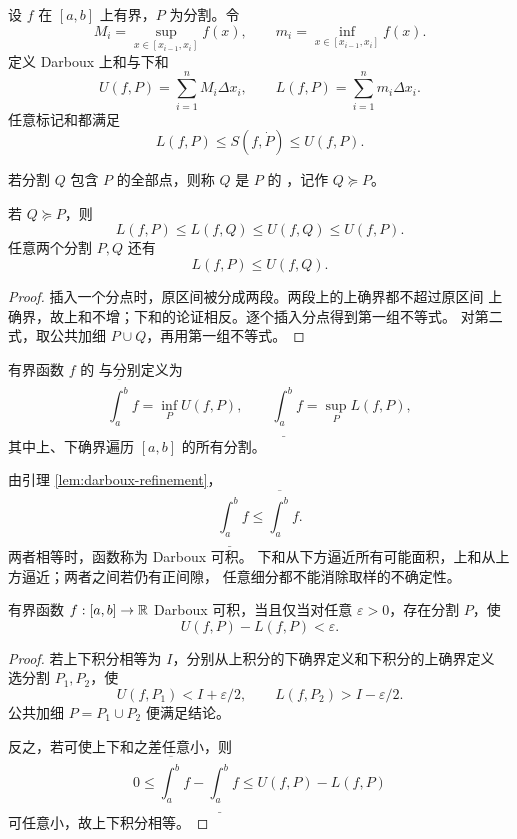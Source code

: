 设 \(f\) 在 \([a,b]\) 上有界，\(P\) 为分割。令
\[
 M_i=\sup_{x\in[x_{i-1},x_i]}f(x),\qquad
 m_i=\inf_{x\in[x_{i-1},x_i]}f(x).
\]
定义 Darboux 上和与下和
\[
 U(f,P)=\sum_{i=1}^n M_i\Delta x_i,\qquad
 L(f,P)=\sum_{i=1}^n m_i\Delta x_i.
\]
任意标记和都满足
\[
 L(f,P)\le S(f,\dot P)\le U(f,P).
\]

\begin{definition}
若分割 \(Q\) 包含 \(P\) 的全部点，则称 \(Q\) 是 \(P\) 的
，记作 \(Q\succeq P\)。
\end{definition}

\begin{lemma}[加细的单调性]
\label{lem:darboux-refinement}
若 \(Q\succeq P\)，则
\[
 L(f,P)\le L(f,Q)\le U(f,Q)\le U(f,P).
\]
任意两个分割 \(P,Q\) 还有
\[
 L(f,P)\le U(f,Q).
\]
\end{lemma}

\begin{proof}
插入一个分点时，原区间被分成两段。两段上的上确界都不超过原区间
上确界，故上和不增；下和的论证相反。逐个插入分点得到第一组不等式。
对第二式，取公共加细 \(P\cup Q\)，再用第一组不等式。
\end{proof}

\begin{definition}
有界函数 \(f\) 的 与分别定义为
\[
 \overline{\int_a^b} f
 =\inf_P U(f,P),\qquad
 \underline{\int_a^b} f
 =\sup_P L(f,P),
\]
其中上、下确界遍历 \([a,b]\) 的所有分割。
\end{definition}

由引理 \ref{lem:darboux-refinement}，
\[
 \underline{\int_a^b} f
 \le \overline{\int_a^b} f.
\]
两者相等时，函数称为 Darboux 可积。
下和从下方逼近所有可能面积，上和从上方逼近；两者之间若仍有正间隙，
任意细分都不能消除取样的不确定性。

\begin{theorem}[Darboux 判据]
\label{thm:darboux-criterion}
有界函数 \(f:[a,b]\to\mathbb{R}\) Darboux 可积，当且仅当对任意
\(\varepsilon>0\)，存在分割 \(P\)，使
\[
 U(f,P)-L(f,P)<\varepsilon.
\]
\end{theorem}

\begin{proof}
若上下积分相等为 \(I\)，分别从上积分的下确界定义和下积分的上确界定义
选分割 \(P_1,P_2\)，使
\[
 U(f,P_1)<I+\varepsilon/2,\qquad
 L(f,P_2)>I-\varepsilon/2.
\]
公共加细 \(P=P_1\cup P_2\) 便满足结论。

反之，若可使上下和之差任意小，则
\[
 0\le
 \overline{\int_a^b}f-\underline{\int_a^b}f
 \le U(f,P)-L(f,P)
\]
可任意小，故上下积分相等。
\end{proof}

